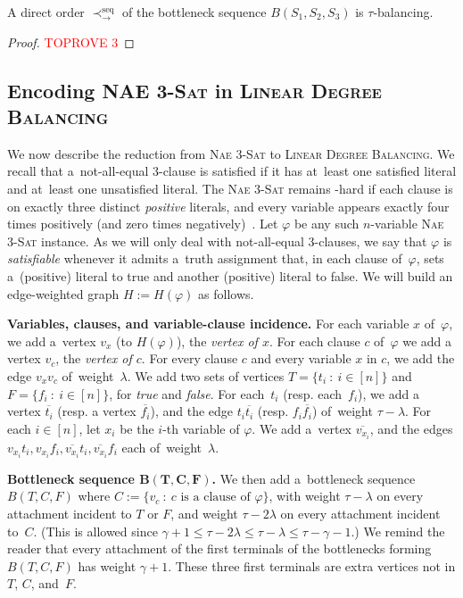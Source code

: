 \documentclass[a4paper,UKenglish,cleveref,hyperref,autoref]{lipics-v2021}
\newcommand{\ldb}{\textsc{Linear Degree Balancing}\xspace}
\begin{document}
\begin{lemma}\label{lem:direct-order}
A direct order $\prec^\text{seq}_{\rightarrow}$ of the bottleneck sequence $B(S_1, S_2, S_3)$ is $\tau$-balancing.
\end{lemma}
\begin{proof}\textcolor{red}{TOPROVE 3}\end{proof}

\subsection{Encoding \textsc{NAE 3-Sat} in \ldb}

We now describe the reduction from \textsc{Nae 3-Sat} to \ldb.
We recall that a~not-all-equal 3-clause is satisfied if it has at~least one satisfied literal and at~least one unsatisfied literal.
The \textsc{Nae 3-Sat} remains \NP-hard if each clause is on exactly three distinct \emph{positive} literals, and every variable appears exactly four times positively (and zero times negatively)~\cite{Darmann20}.
Let $\varphi$ be any such $n$-variable \textsc{Nae 3-Sat} instance.
As we will only deal with not-all-equal 3-clauses, we say that $\varphi$ is \emph{satisfiable} whenever it admits a~truth assignment that, in each clause of~$\varphi$, sets a~(positive) literal to true and another (positive) literal to false. 
We will build an edge-weighted graph $H := H(\varphi)$ as follows.



\medskip

\textbf{Variables, clauses, and variable-clause incidence.}
For each variable $x$ of~$\varphi$, we add a~vertex $v_x$ (to $H(\varphi)$), the \emph{vertex of $x$}.
For each clause $c$ of~$\varphi$ we add a vertex $v_c$, the \emph{vertex of $c$}.
For every clause $c$ and every variable $x$ in $c$, we add the edge $v_xv_c$ of~weight~$\lambda$.
We add two sets of vertices $T = \{t_i \ : \ i \in [n]\}$ and $F = \{f_i \ : \ i \in [n]\}$, for \emph{true} and \emph{false}.
For each~$t_i$ (resp. each~$f_i$), we add a vertex $\overline{t_i}$ (resp. a vertex $\overline{f_i}$), and the edge $t_i \overline{t_i}$ (resp. $f_i \overline{f_i}$) of~weight $\tau - \lambda$.
For each $i \in [n]$, let $x_i$ be the $i$-th variable of $\varphi$.
We add a~vertex $\overline{v_{x_i}}$, and the edges $v_{x_i}t_i, v_{x_i}f_i, \overline{v_{x_i}}t_i, \overline{v_{x_i}}f_i$ each of~weight~$\lambda$.

\medskip

\textbf{Bottleneck sequence $\bm{B(T,C,F)}$.}
We then add a~bottleneck sequence $B(T,C,F)$ where $C := \{v_c \ : \ c\text{ is a clause of } \varphi \}$, with weight $\tau - \lambda$ on every attachment incident to $T$ or $F$, and weight $\tau - 2\lambda$ on every attachment incident to~$C$.
(This is allowed since $\gamma + 1 \leqslant \tau - 2\lambda \leqslant \tau - \lambda \leqslant \tau - \gamma - 1$.)
We remind the reader that every attachment of the first terminals of the bottlenecks forming $B(T,C,F)$ has weight $\gamma+1$.
These three first terminals are extra vertices not in $T$, $C$, and~$F$.
\end{document}
